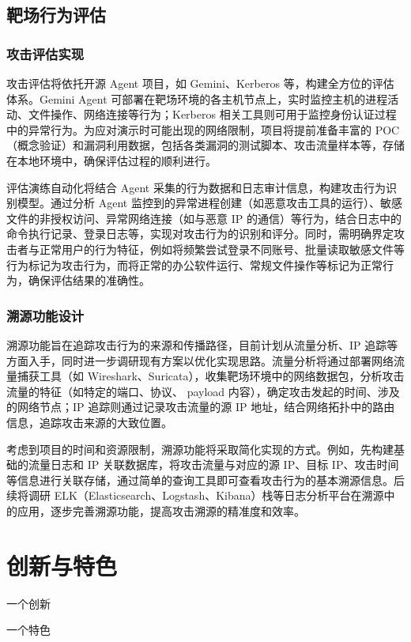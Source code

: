 \documentclass[lang=cn,10pt]{elegantbook}
\begin{document}
\section{靶场行为评估}
\subsection{攻击评估实现}
攻击评估将依托开源 Agent 项目，如 Gemini、Kerberos 等，构建全方位的评估体系。Gemini Agent 可部署在靶场环境的各主机节点上，实时监控主机的进程活动、文件操作、网络连接等行为；Kerberos 相关工具则可用于监控身份认证过程中的异常行为。为应对演示时可能出现的网络限制，项目将提前准备丰富的 POC（概念验证）和漏洞利用数据，包括各类漏洞的测试脚本、攻击流量样本等，存储在本地环境中，确保评估过程的顺利进行。​

评估演练自动化将结合 Agent 采集的行为数据和日志审计信息，构建攻击行为识别模型。通过分析 Agent 监控到的异常进程创建（如恶意攻击工具的运行）、敏感文件的非授权访问、异常网络连接（如与恶意 IP 的通信）等行为，结合日志中的命令执行记录、登录日志等，实现对攻击行为的识别和评分。同时，需明确界定攻击者与正常用户的行为特征，例如将频繁尝试登录不同账号、批量读取敏感文件等行为标记为攻击行为，而将正常的办公软件运行、常规文件操作等标记为正常行为，确保评估结果的准确性。

\subsection{溯源功能设计}
溯源功能旨在追踪攻击行为的来源和传播路径，目前计划从流量分析、IP 追踪等方面入手，同时进一步调研现有方案以优化实现思路。流量分析将通过部署网络流量捕获工具（如 Wireshark、Suricata），收集靶场环境中的网络数据包，分析攻击流量的特征（如特定的端口、协议、 payload 内容），确定攻击发起的时间、涉及的网络节点；IP 追踪则通过记录攻击流量的源 IP 地址，结合网络拓扑中的路由信息，追踪攻击来源的大致位置。​

考虑到项目的时间和资源限制，溯源功能将采取简化实现的方式。例如，先构建基础的流量日志和 IP 关联数据库，将攻击流量与对应的源 IP、目标 IP、攻击时间等信息进行关联存储，通过简单的查询工具即可查看攻击行为的基本溯源信息。后续将调研 ELK（Elasticsearch、Logstash、Kibana）栈等日志分析平台在溯源中的应用，逐步完善溯源功能，提高攻击溯源的精准度和效率。

\chapter{创新与特色}
\begin{introduction}
  \item 一个创新
  \item 一个特色
\end{introduction}
\end{document}
